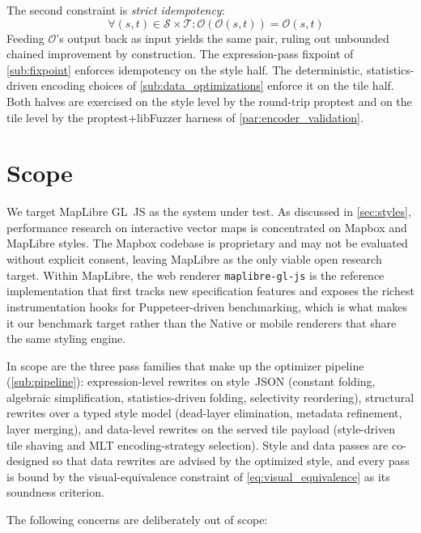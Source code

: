 The second constraint is \emph{strict idempotency}:
\begin{equation}\label{eq:idempotency}
    \quad \forall (s, t) \in \mathcal{S} \times \mathcal{T}: \mathcal{O}(\mathcal{O}(s, t)) = \mathcal{O}(s, t)
\end{equation}
Feeding $\mathcal{O}$'s output back as input yields the same pair, ruling out unbounded chained improvement by construction.
The expression-pass fixpoint of \cref{sub:fixpoint} enforces idempotency on the style half.
The deterministic, statistics-driven encoding choices of \cref{sub:data_optimizations} enforce it on the tile half.
Both halves are exercised on the style level by the round-trip proptest and on the tile level by the proptest+libFuzzer harness of \cref{par:encoder_validation}.

\section{Scope}\label{sec:scope}

We target MapLibre GL~JS as the system under test.
As discussed in \cref{sec:styles}, performance research on interactive vector maps is concentrated on Mapbox and MapLibre styles.
The Mapbox codebase is proprietary and may not be evaluated without explicit consent, leaving MapLibre as the only viable open research target.
Within MapLibre, the web renderer \texttt{maplibre-gl-js} is the reference implementation that first tracks new specification features and exposes the richest instrumentation hooks for Puppeteer-driven benchmarking, which is what makes it our benchmark target rather than the Native or mobile renderers that share the same styling engine.

In scope are the three pass families that make up the optimizer pipeline (\cref{sub:pipeline}): expression-level rewrites on style~\ac{JSON} (constant folding, algebraic simplification, statistics-driven folding, selectivity reordering), structural rewrites over a typed style model (dead-layer elimination, metadata refinement, layer merging), and data-level rewrites on the served tile payload (style-driven tile shaving and \ac{MLT} encoding-strategy selection).
Style and data passes are co-designed so that data rewrites are advised by the optimized style, and every pass is bound by the visual-equivalence constraint of \cref{eq:visual_equivalence} as its soundness criterion.

The following concerns are deliberately out of scope:

